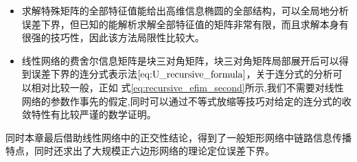   \begin{itemize}
  \item 求解特殊矩阵的全部特征值能给出高维信息椭圆的全部结构，可以全局地分析误差下界，但已知的能解析求解全部特征值的矩阵非常有限，而且求解本身有很强的技巧性，因此该方法局限性比较大。
  \item 线性网络的费舍尔信息矩阵是块三对角矩阵，块三对角矩阵局部展开后可以得到误差下界的连分式表示法$\ref{eq:U_recursive_formula}$，关于连分式的分析可以相对比较一般，正如 式\ref{eq:recursive_efim_second}所示,我们不需要对线性网络的参数作事先的假定,同时可以通过不等式放缩等技巧对给定的连分式的收敛特性有比较严谨的数学证明。
  \end{itemize}

  同时本章最后借助线性网络中的正交性结论，得到了一般矩形网络中链路信息传播特点，同时还求出了大规模正六边形网络的理论定位误差下界。